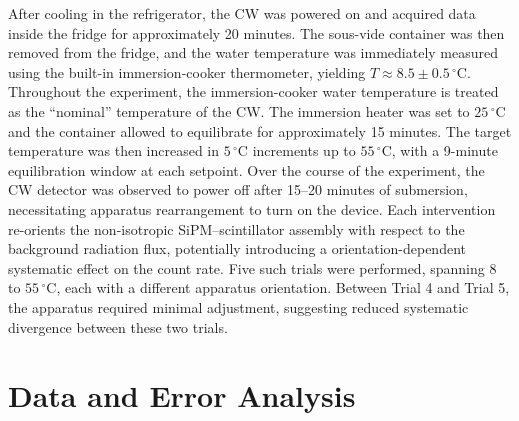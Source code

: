 \documentclass[aps,twocolumn,secnumarabic,balancelastpage,amsmath,amssymb,nofootinbib,floatfix]{revtex4-1}
\begin{document}
After cooling in the refrigerator, the CW was powered on and acquired data inside the fridge for approximately 20 minutes. The sous-vide container was then removed from the fridge, and the water temperature was immediately measured using the built-in immersion-cooker thermometer, yielding $T \approx 8.5 \pm 0.5\,^{\circ}\text{C}$. Throughout the experiment, the immersion-cooker water temperature is treated as the ``nominal'' temperature of the CW. The immersion heater was set to $25\,^{\circ}\text{C}$ and the container allowed to equilibrate for approximately 15 minutes. The target temperature was then increased in $5\,^{\circ}\text{C}$ increments up to $55\,^{\circ}\text{C}$, with a 9-minute equilibration window at each setpoint. Over the course of the experiment, the CW detector was observed to power off after 15--20 minutes of submersion, necessitating apparatus rearrangement to turn on the device. Each intervention re-orients the non-isotropic SiPM--scintillator assembly with respect to the background radiation flux, potentially introducing a orientation-dependent systematic effect on the count rate. Five such trials were performed, spanning $8$ to $55\,^{\circ}\text{C}$, each with a different apparatus orientation. Between Trial 4 and Trial 5, the apparatus required minimal adjustment, suggesting reduced systematic divergence between these two trials.

\section{Data and Error Analysis}
\end{document}
